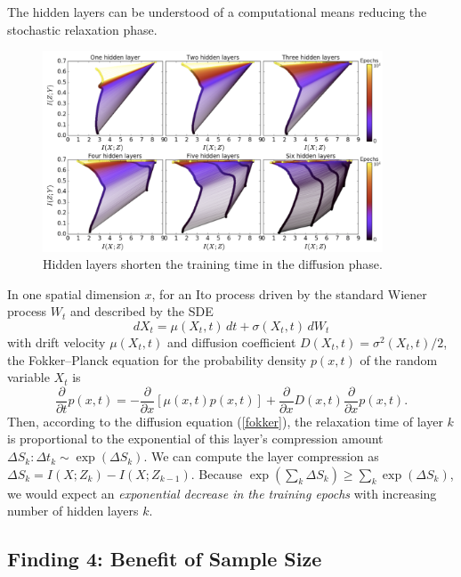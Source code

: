 \documentclass[11pt]{article}
\begin{document}
The hidden layers can be understood of a computational means reducing the stochastic relaxation phase.

\begin{figure}[H]
	\centering
	\includegraphics[width=0.9\textwidth]{layers}
	\caption{Hidden layers shorten the training time in the diffusion phase.}
\end{figure}

In one spatial dimension $x$, for an Ito process driven by the standard Wiener process $W_t$ and described by the SDE
\begin{equation}
dX_t = \mu(X_t, t) \,dt + \sigma(X_t, t) \,dW_t
\end{equation}
with drift velocity  $\mu(X_t, t)$ and diffusion coefficient $D(X_t, t) = \sigma^2(X_t, t)/2$, the Fokker–Planck equation for the probability density $p(x, t)$ of the random variable $X_t$ is
\begin{equation}
\frac{\partial}{\partial t} p(x, t) = -\frac{\partial}{\partial x}\left[\mu(x, t) p(x, t)\right] + \frac{\partial}{\partial x}D(x, t)\frac{\partial}{\partial x}p(x, t).
\label{fokker}
\end{equation}
Then, according to the diffusion equation (\ref{fokker}), the relaxation time of layer $k$ is proportional to the exponential of this layer's compression amount $\Delta S_k:\Delta t_k\sim \exp(\Delta S_k)$. We can compute the layer compression as $\Delta S_k = I(X;Z_k)-I(X;Z_{k-1})$. Because $\exp(\sum_k \Delta S_k) \geq \sum_k \exp(\Delta S_k)$, we would expect an \emph{exponential decrease in the training epochs} with increasing number of hidden layers $k$.

\subsection*{Finding 4: Benefit of Sample Size}
\end{document}
